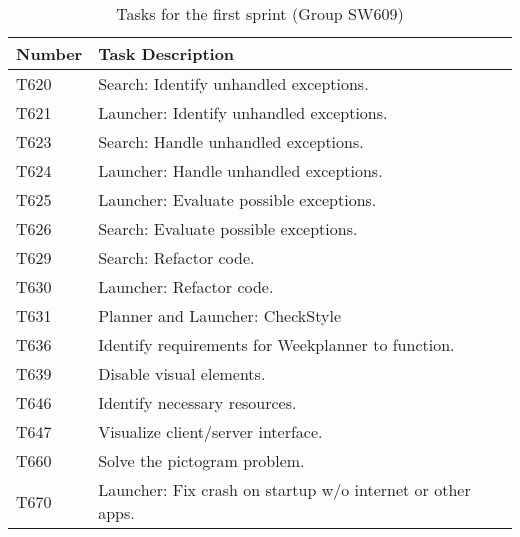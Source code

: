 \begin{table}[H]
\centering
\label{S01:Tasks}
\begin{tabular}{|l|l|}
\hline
Number 			& Task Description 											\\\hline
T620  			& Search: Identify unhandled exceptions.                 	\\\hline
T621    	   	& Launcher: Identify unhandled exceptions. 					\\\hline 
T623	       	& Search: Handle unhandled exceptions.                 		\\\hline
T624    	   	& Launcher: Handle unhandled exceptions.  					\\\hline
T625   	   		& Launcher: Evaluate possible exceptions.        			\\\hline
T626   	   		& Search: Evaluate possible exceptions.                		\\\hline
T629  	   		& Search: Refactor code.			   						\\\hline
T630       		& Launcher: Refactor code.                 					\\\hline
T631       		& Planner and Launcher: CheckStyle                 			\\\hline
T636       		& Identify requirements for Weekplanner to function.   		\\\hline 
T639       		& Disable visual elements.                 					\\\hline
T646       		& Identify necessary resources.                 			\\\hline
T647       		& Visualize client/server interface.                 		\\\hline 
T660       		& Solve the pictogram problem.                 				\\\hline
T670       		& Launcher: Fix crash on startup w/o internet or other apps.\\\hline
\end{tabular}
\caption{Tasks for the first sprint (Group SW609)}
\end{table} 







